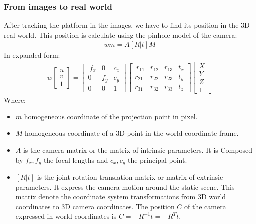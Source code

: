 \subsubsection{From images to real world}
After tracking the platform in the images, we have to find its position in the 3D real world. This position is calculate using the pinhole model of the camera: %
\begin{align}
wm = A [R|t]M
 \label{eq:pinholemodel}
\end{align}
In expanded form:
\begin{align}
{w\begin{bmatrix}
u \\[10pt]
v  \\[10pt]
1
\end{bmatrix}}=
{\begin{bmatrix}\
f_x & 0 & c_x \\[10pt]
0 & f_y &c_y \\[10pt]
0 & 0 & 1
\end{bmatrix}}
{\begin{bmatrix}\
r_{11} & r_{12} & r_{13} & t_{x} \\[10pt]
r_{21} & r_{22} & r_{23} & t_{y} \\[10pt]
r_{31} & r_{32} & r_{33} & t_{z}
\end{bmatrix}}
{\begin{bmatrix}
X \\[10pt]
Y \\[10pt]
Z \\[10pt]
1
\end{bmatrix}}
\end{align}
Where:
\begin{itemize}
 \item $m$ homogeneous coordinate of the projection point in pixel.
  \item $M$ homogeneous coordinate of a 3D point in the world coordinate frame.
 \item $A$ is the camera matrix or the matrix of intrinsic parameters. It is Composed by $f_x,f_y$ the focal lengths and $c_x,c_y$ the principal point.
 \item $[R|t]$ is the joint rotation-translation matrix or matrix of extrinsic parameters. It express the camera motion around the static scene. This matrix denote the coordinate system transformations from 3D world coordinates to 3D camera coordinates. The position $C$ of the camera expressed in world coordinates is $C=-R^{{-1}}t=-R^{T}t$.
\end{itemize}

